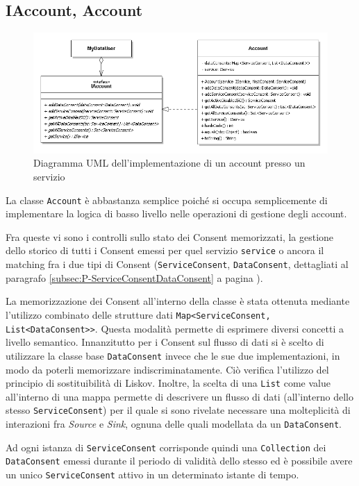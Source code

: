 \subsection{IAccount, Account}
\label{subsec:P-Account}
\begin{figure} [h]
	\centering
	\includegraphics[width=0.95\linewidth]{pictures/Accounting-Account.png}
	\caption{Diagramma UML dell'implementazione di un account presso un servizio}
	\label{fig:Accounting-Account}
\end{figure}
La classe \texttt{Account} \`e abbastanza semplice poich\'e si occupa semplicemente di implementare la logica di basso livello nelle operazioni di gestione degli account.

Fra queste vi sono i controlli sullo stato dei Consent memorizzati, la gestione dello storico di tutti i Consent emessi per quel servizio \texttt{service} o ancora il matching fra i due tipi di Consent (\texttt{ServiceConsent}, \texttt{DataConsent}, dettagliati al paragrafo \ref{subsec:P-ServiceConsentDataConsent} a pagina \pageref{subsec:P-ServiceConsentDataConsent}).

La memorizzazione dei Consent all’interno della classe \`e stata ottenuta mediante l’utilizzo combinato delle strutture dati \texttt{Map<ServiceConsent, \-List\-<Data\-Consent>{}>}. Questa modalit\`a permette di esprimere diversi concetti a livello semantico. Innanzitutto per i Consent sul flusso di dati si \`e scelto di utilizzare la classe base \texttt{DataConsent} invece che le sue due implementazioni, in modo da poterli memorizzare indiscriminatamente. Ci\`o verifica l’utilizzo del principio di sostituibilit\`a di Liskov. Inoltre, la scelta di una \texttt{List} come value all’interno di una mappa permette di descrivere un flusso di dati (all’interno dello stesso \texttt{ServiceConsent}) per il quale si sono rivelate necessare una molteplicit\`a di interazioni fra \textit{Source} e \textit{Sink}, ognuna delle quali modellata da un \texttt{DataConsent}.

Ad ogni istanza di \texttt{ServiceConsent} corrisponde quindi una \texttt{Collection} dei \texttt{DataConsent} emessi durante il periodo di validit\`a dello stesso ed \`e possibile avere un unico \texttt{ServiceConsent} attivo in un determinato istante di tempo.

